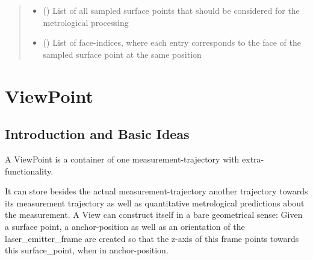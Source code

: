 \documentclass[letterpaper,10pt,english]{sphinxmanual}
\begin{document}
\begin{fulllineitems}
\begin{fulllineitems}
\begin{quote}
\begin{description}
\begin{itemize}
\item {} 
 (\sphinxstyleliteralemphasis{{[}}\sphinxstyleliteralemphasis{{]}}) \textendash{} List of all sampled surface points that should be considered for the metrological processing

\item {} 
 (\sphinxstyleliteralemphasis{{[}}\sphinxstyleliteralemphasis{{]}}) \textendash{} List of face-indices, where each entry corresponds to the face of the sampled surface point at the same position

\end{itemize}

\end{description}\end{quote}

\end{fulllineitems}


\end{fulllineitems}



\chapter{ViewPoint}
\label{\detokenize{module_view::doc}}\label{\detokenize{module_view:viewpoint}}\label{\detokenize{module_view:id1}}

\section{Introduction and Basic Ideas}
\label{\detokenize{module_view:introduction-and-basic-ideas}}
A ViewPoint is a container of one measurement-trajectory with extra-functionality.

It can store besides the actual measurement-trajectory another trajectory towards its
measurement trajectory as well as quantitative metrological predictions about the measurement. A View can construct itself in a bare geometrical sense: Given a surface point,
a anchor-position as well as an orientation of the laser\_emitter\_frame are created so that the z-axis of this frame points towards this surface\_point, when in anchor-position.
\end{document}
